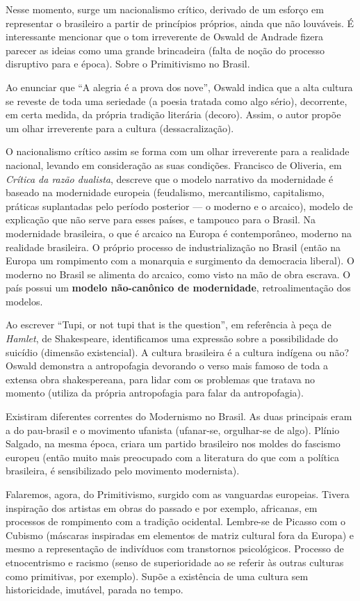 Nesse momento, surge um nacionalismo crítico, derivado de um esforço em representar o brasileiro a partir de princípios próprios, ainda que não louváveis. É interessante mencionar que o tom irreverente de Oswald de Andrade fizera parecer as ideias como uma grande brincadeira (falta de noção do processo disruptivo para e época). Sobre o Primitivismo no Brasil.

Ao enunciar que ``A alegria é a prova dos nove'', Oswald indica que a alta cultura se reveste de toda uma seriedade (a poesia tratada como algo sério), decorrente, em certa medida, da própria tradição literária (decoro). Assim, o autor propõe um olhar irreverente para a cultura (dessacralização).

O nacionalismo crítico assim se forma com um olhar irreverente para a realidade nacional, levando em consideração as suas condições. Francisco de Oliveria, em \textit{Crítica da razão dualista}, descreve que o modelo narrativo da modernidade é baseado na modernidade europeia (feudalismo, mercantilismo, capitalismo, práticas suplantadas pelo período posterior — o moderno e o arcaico), modelo de explicação que não serve para esses países, e tampouco para o Brasil. Na modernidade brasileira, o que é arcaico na Europa é contemporâneo, moderno na realidade brasileira. O próprio processo de industrialização no Brasil (então na Europa um rompimento com a monarquia e surgimento da democracia liberal). O moderno no Brasil se alimenta do arcaico, como visto na mão de obra escrava. O país possui um \textbf{modelo não-canônico de modernidade}, retroalimentação dos modelos.

Ao escrever ``Tupi, or not tupi that is the question'', em referência à peça de \textit{Hamlet}, de Shakespeare, identificamos uma expressão sobre a possibilidade do suicídio (dimensão existencial). A cultura brasileira é a cultura indígena ou não? Oswald demonstra a antropofagia devorando o verso mais famoso de toda a extensa obra shakespereana, para lidar com os problemas que tratava no momento (utiliza da própria antropofagia para falar da antropofagia).

Existiram diferentes correntes do Modernismo no Brasil. As duas principais eram a do pau-brasil e o movimento ufanista (ufanar-se, orgulhar-se de algo). Plínio Salgado, na mesma época, criara um partido brasileiro nos moldes do fascismo europeu (então muito mais preocupado com a literatura do que com a política brasileira, é sensibilizado pelo movimento modernista).

Falaremos, agora, do Primitivismo, surgido com as vanguardas europeias. Tivera inspiração dos artistas em obras do passado e por exemplo, africanas, em processos de rompimento com a tradição ocidental. Lembre-se de Picasso com o Cubismo (máscaras inspiradas em elementos de matriz cultural fora da Europa) e mesmo a representação de indivíduos com transtornos psicológicos. Processo de etnocentrismo e racismo (senso de superioridade ao se referir às outras culturas como primitivas, por exemplo). Supõe a existência de uma cultura sem historicidade, imutável, parada no tempo.

